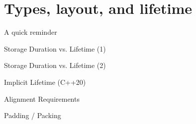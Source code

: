 \section{Types, layout, and lifetime}

\begin{frame}{A quick reminder}
\end{frame}

\begin{frame}{Storage Duration vs. Lifetime (1)}
\end{frame}

\begin{frame}{Storage Duration vs. Lifetime (2)}
\end{frame}

\begin{frame}{Implicit Lifetime (C++20)}
\end{frame}

\begin{frame}{Alignment Requirements}
\end{frame}

\begin{frame}{Padding / Packing}
\end{frame}

